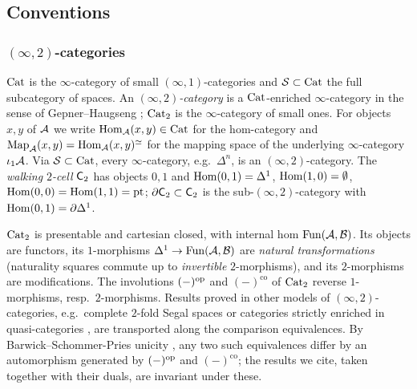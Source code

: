 \subsection{Conventions}
\label{subsec:prelim-conventions}

\subsubsection*{$(\infty,2)$-categories}
%
$\mathrm{Cat}$ is the $\infty$-category of small $(\infty,1)$-categories and $\mathcal{S}
\subset \mathrm{Cat}$ the full subcategory of spaces.
An \emph{$(\infty,2)$-category} is a $\mathrm{Cat}$-enriched $\infty$-category in the
sense of Gepner--Haugseng \cite{gepnerhaugseng2015enriched};
$\mathrm{Cat}_{2}$ is the $\infty$-category of small ones.
For objects $x,y$ of $\mathcal{A}$ we write
$\operatorname{Hom}_{\mathcal{A}}(x,y) \in \mathrm{Cat}$
for the hom-category and
$\operatorname{Map}_{\mathcal{A}}(x,y) = \operatorname{Hom}_{\mathcal{A}}(x,y)^{\simeq}$
for the mapping space of the underlying $\infty$-category $\iota_{1}\mathcal{A}$.
Via $\mathcal{S} \subset \mathrm{Cat}$, every $\infty$-category, e.g.\ $\Delta^{n}$,
is an $(\infty,2)$-category. The \emph{walking $2$-cell} $\mathsf{C}_{2}$ has objects
$0,1$ and
$\operatorname{Hom}(0,1) = \Delta^{1}$,
$\operatorname{Hom}(1,0) = \emptyset$,
$\operatorname{Hom}(0,0) = \operatorname{Hom}(1,1) = \mathrm{pt}$;
$\partial\mathsf{C}_{2} \subset \mathsf{C}_{2}$ is the sub-$(\infty,2)$-category with
$\operatorname{Hom}(0,1) = \partial\Delta^{1}$.

%
$\mathrm{Cat}_{2}$ is presentable and cartesian closed, with internal hom $\operatorname{Fun}(\mathcal{A},\mathcal{B})$.
Its objects are functors, its $1$-morphisms
$\Delta^{1} \to \operatorname{Fun}(\mathcal{A},\mathcal{B})$
are \emph{natural transformations} (naturality squares commute up to
\emph{invertible} $2$-morphisms), and its $2$-morphisms are modifications.
The involutions $(-)^{\mathrm{op}}$ and $(-)^{\mathrm{co}}$ of $\mathrm{Cat}_{2}$ reverse
$1$-morphisms, resp.\ $2$-morphisms.
Results proved in other models of $(\infty,2)$-categories,
e.g.\ complete $2$-fold Segal spaces \cite{gepnerhaugseng2015enriched} or
categories strictly enriched in quasi-categories
\cite{haugseng2015rectification}, are transported along the comparison
equivalences. By Barwick--Schommer-Pries unicity
\cite{barwickschommerpries2021unicity}, any two such equivalences differ by an
automorphism generated by $(-)^{\mathrm{op}}$ and $(-)^{\mathrm{co}}$;
the results we cite, taken together with their duals, are invariant under these.

